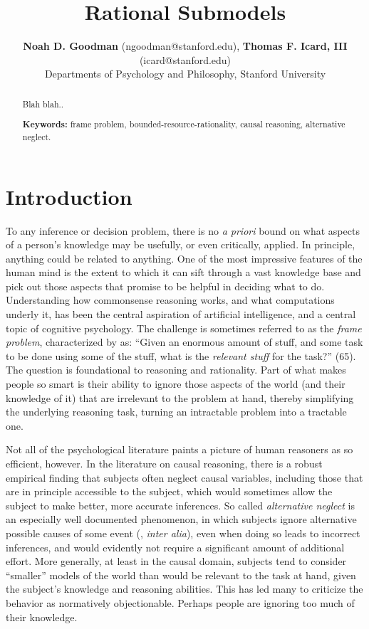 \documentclass[10pt,letterpaper]{article}
\title{Rational Submodels}
\author{{\large \bf Noah D. Goodman} (ngoodman@stanford.edu), {\large \bf Thomas F. Icard, III} (icard@stanford.edu) \\
  Departments of Psychology and Philosophy, Stanford University}
\begin{document}
\maketitle


\begin{abstract}
Blah blah.. \vspace{2.2in}

\textbf{Keywords:} 
frame problem, bounded-resource-rationality, causal reasoning, alternative neglect.
\end{abstract}

\section{Introduction}

To any inference or decision problem, there is no \emph{a priori} bound on what aspects of a person's knowledge may be usefully, or even critically, applied. In principle, anything could be related to anything. One of the most impressive features of the human mind is the extent to which it can sift through a vast knowledge base and pick out those aspects that promise to be helpful in deciding what to do. Understanding how  commonsense reasoning works, and what computations underly it, has been the central aspiration of artificial intelligence, and a central topic of cognitive psychology. The challenge is sometimes referred to as the \emph{frame problem}, characterized by \cite{Glymour1987} as: ``Given an enormous amount of stuff, and some task to be done using some of the stuff, what is the \emph{relevant stuff} for the task?'' (65). The question is foundational to reasoning and rationality. Part of what makes people so smart is their ability to ignore those aspects of the world (and their knowledge of it) that are irrelevant to the problem at hand, thereby simplifying the underlying reasoning task, turning an intractable problem into a tractable one.

Not all of the psychological literature paints a picture of human reasoners as so efficient, however. In the literature on causal reasoning, there is a robust empirical finding that subjects often neglect causal variables, including those that are in principle accessible to the subject, which would sometimes allow the subject to make better, more accurate inferences. So called \emph{alternative neglect} is an especially well documented phenomenon, in which subjects ignore alternative possible causes of some event (\citealt{Fischhoff1978,KlaymanHa,Fernbach2011}, \emph{inter alia}), even when doing so leads to incorrect inferences, and would evidently not require a significant  amount of additional effort. More generally, at least in the causal domain, subjects tend to consider ``smaller'' models of the world than would be relevant to the task at hand, given the subject's knowledge and reasoning abilities. This has led many to criticize the behavior as normatively objectionable. Perhaps people are ignoring too much of their knowledge.
\end{document}
